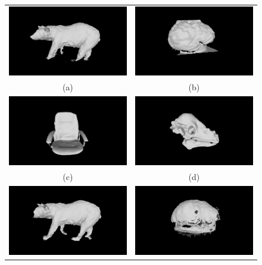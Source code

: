 \begin{figure}[!htbp]
  \centering
  \begin{tabular}{cc}
    \includegraphics[width=.4\linewidth]{figures/object_recon/comp/itm/bear00.png}&
    \includegraphics[width=.4\linewidth]{figures/object_recon/comp/itm/brain00.png}\\
    (a) & (b)\\
		\includegraphics[width=.4\linewidth]{figures/object_recon/comp/itm/chair00.png}&
    \includegraphics[width=.4\linewidth]{figures/object_recon/comp/itm/dino00.png} \\
    (c) & (d) \\
		\includegraphics[width=.4\linewidth]{figures/object_recon/comp/prob/bear00.png}&
    \includegraphics[width=.4\linewidth]{figures/object_recon/comp/prob/brain00.png}\\

\end{tabular}
\end{figure}
